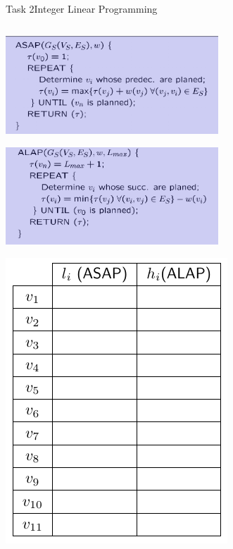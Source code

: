 \begin{frame}[allowframebreaks]{Task 2}{Integer Linear Programming}
\begin{tasknoinc}
\begin{columns}
    \end{columns}
  \end{tasknoinc}
  \begin{requirementsnoinc}
    \centering
    \includegraphics[width=0.6\textwidth]{./figures/asap.png}
  \end{requirementsnoinc}
  \begin{requirementsnoinc}
    \centering
    \includegraphics[width=0.6\textwidth]{./figures/alap.png}
  \end{requirementsnoinc}
  \begin{solutionnoinc}
    \centering
    \includegraphics[height=0.6\paperheight]{./figures/task2_earliest_and_latest_starting_times_empty.png}
  \end{solutionnoinc}
  \begin{solution}

\end{solution}
\end{frame}

